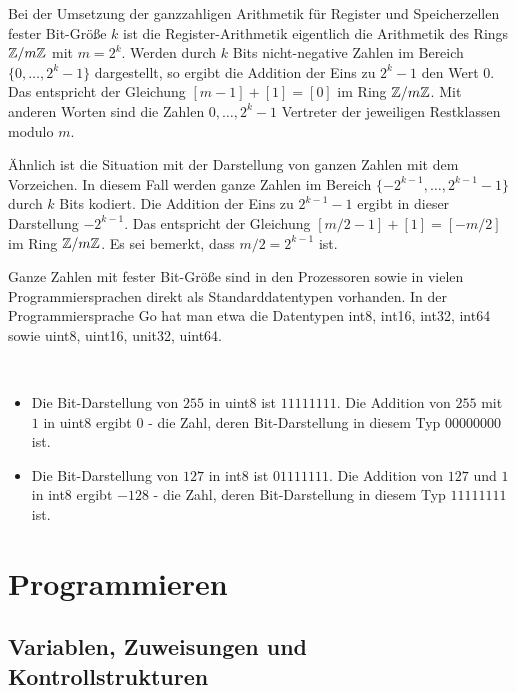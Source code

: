 \begin{bem}
		Bei der Umsetzung der ganzzahligen Arithmetik für Register und Speicherzellen fester Bit-Größe $k$ ist die Register-Arithmetik eigentlich die Arithmetik des Rings $\mathbb{Z} / m \mathbb{Z}$ mit $m=2^k$. Werden durch $k$ Bits nicht-negative Zahlen im Bereich $\{0,\ldots,2^k-1\}$ dargestellt, so ergibt die Addition der Eins zu $2^k-1$ den Wert $0$. Das entspricht der Gleichung $[m-1] + [1] = [0]$ im Ring $\mathbb{Z} / m \mathbb{Z}$. Mit anderen Worten sind die Zahlen $0,\ldots,2^k-1$ Vertreter der jeweiligen Restklassen modulo $m$. 
		
		Ähnlich ist die Situation mit der Darstellung von ganzen Zahlen mit dem Vorzeichen. In diesem Fall werden ganze Zahlen im Bereich  $\{-2^{k-1},\ldots,2^{k-1}  - 1\}$ durch $k$ Bits kodiert. Die Addition der Eins zu $2^{k-1}-1$ ergibt in dieser Darstellung $-2^{k-1}$. Das entspricht der Gleichung $[m/2-1] + [1] =[-m/2]$ im Ring $\mathbb{Z} / m \mathbb{Z}$. Es sei bemerkt, dass  $m/2=2^{k-1}$ ist.
		
		Ganze Zahlen mit fester Bit-Größe sind in den Prozessoren sowie in vielen Programmiersprachen direkt als Standarddatentypen vorhanden. In der Programmiersprache Go hat man etwa die Datentypen int8, int16, int32, int64 sowie uint8, uint16, unit32, uint64. 
\end{bem} 

\begin{bsp}\ 
	\begin{itemize} 
		\item Die Bit-Darstellung von $255$ in uint8 ist $11111111$. Die Addition von $255$ mit $1$ in uint8 ergibt $0$ - die Zahl, deren Bit-Darstellung in diesem Typ $00000000$ ist.  
		\item Die Bit-Darstellung von $127$ in int8 ist $01111111$. Die Addition von $127$ und $1$ in int8 ergibt $-128$ - die Zahl, deren Bit-Darstellung in diesem Typ $11111111$ ist. 
	\end{itemize} 
\end{bsp}


\section{Programmieren} 

\subsection{Variablen, Zuweisungen und Kontrollstrukturen}

